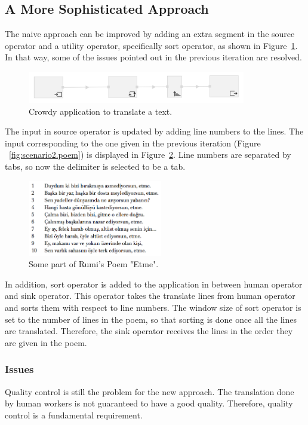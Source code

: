 \subsection{A More Sophisticated Approach}
The naive approach can be improved by adding an extra segment in the source operator and a utility operator, specifically sort operator, as shown in Figure~\ref{fig:scenario2.1}. In that way, some of the issues pointed out in the previous iteration are resolved.

\begin{figure}[ht]
	\centering
	\includegraphics[width=0.85\textwidth]{figures/scenarios/scenario2_1.png}
	\caption{Crowdy application to translate a text.}
	\label{fig:scenario2.1}
\end{figure}

The input in source operator is updated by adding line numbers to the lines. The input corresponding to the one given in the previous iteration (Figure ~\ref{fig:scenario2.poem}) is displayed in Figure~\ref{fig:scenario2.poem2}. Line numbers are separated by tabs, so now the delimiter is selected to be a tab.

\begin{figure}[ht]
	\centering
	\includegraphics[height=125px]{figures/scenarios/poem2.png}
	\caption{Some part of Rumi's Poem "Etme".}
	\label{fig:scenario2.poem2}
\end{figure}

In addition, sort operator is added to the application in between human operator and sink operator. This operator takes the translate lines from human operator and sorts them with respect to line numbers. The window size of sort operator is set to the number of lines in the poem, so that sorting is done once all the lines are translated. Therefore, the sink operator receives the lines in the order they are given in the poem.

\subsubsection{Issues}
Quality control is still the problem for the new approach. The translation done by human workers is not guaranteed to have a good quality. Therefore, quality control is a fundamental requirement.

